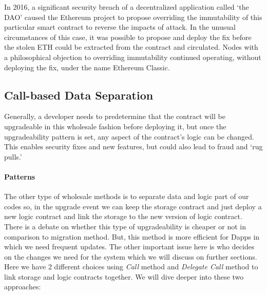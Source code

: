 In 2016, a significant security breach of a decentralized application called `the DAO' caused the Ethereum project to propose overriding the immutability of this particular smart contract to reverse the impacts of attack. In the unusual circumstances of this case, it was possible to propose and deploy the fix before the stolen ETH could be extracted from the contract and circulated. Nodes with a philosophical objection to overriding immutability continued operating, without deploying the fix, under the name Ethereum Classic.




\subsection{Call-based Data Separation}

 Generally, a developer needs to predetermine that the contract will be upgradeable in this wholesale fashion before deploying it, but once the upgradeability pattern is set, any aspect of the contract's logic can be changed. This enables security fixes and new features, but could also lead to fraud and `rug pulls.'


\paragraph{ Patterns}


The other type of wholesale methods is to separate data and logic part of our codes so, in the upgrade event we can keep the storage contract and just deploy a new logic contract and link the storage to the new version of logic contract.
There is a debate on whether this type of upgradeability is cheaper or not in comparison to migration method. But, this method is more efficient for Dapps in which we need frequent updates. The other important issue here is who decides on the changes we need for the system which we will discuss on further sections.
Here we have 2 different choices using \textit{Call} method and \textit{Delegate Call} method to link storage and logic contracts together. We will dive deeper into these two approaches:

